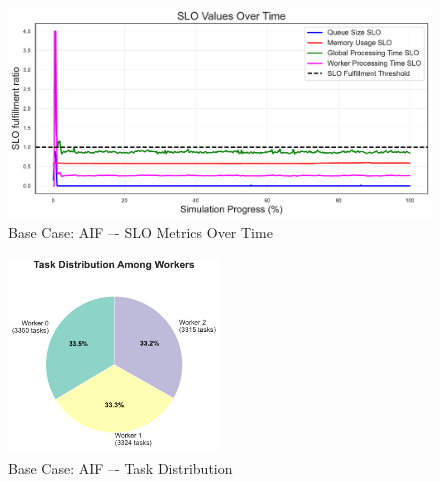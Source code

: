 \begin{figure}[h]
    \centering
    \includegraphics[width=\textwidth]{img/results/basic/active_inference_relative_control_slo_values.pdf}
    \caption{Base Case: AIF –- SLO Metrics Over Time}
\end{figure}
\begin{figure}[h]
    \centering
    \includegraphics[width=0.5\textwidth]{img/results/basic/active_inference_relative_control_task_distribution_pie.pdf}
    \caption{Base Case: AIF –- Task Distribution}
\end{figure}



